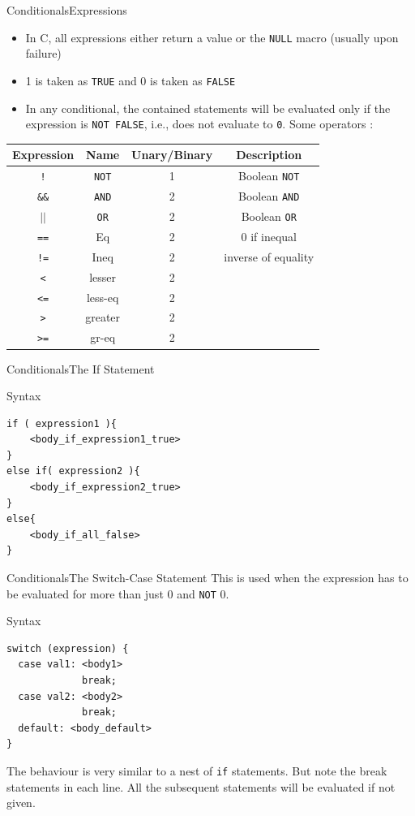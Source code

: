 \documentclass{beamer}
\begin{document}
\begin{frame}[fragile]{Conditionals}{Expressions}
\begin{itemize}
\item In C, all expressions either return a value or the \verb|NULL| macro (usually upon failure)
\item 1 is taken as \verb|TRUE| and 0 is taken as \verb|FALSE|
\item In any conditional, the contained statements will be evaluated only if the expression is \verb|NOT FALSE|, i.e., does not evaluate to \verb|0|. Some operators :
\end{itemize}
\begin{center}
\begin{tabular}{|c|c|c|c|}
\hline
Expression&Name&Unary/Binary&Description\\
\hline
\verb|!|&\verb|NOT|&1&Boolean \verb|NOT|\\
\verb|&&|&\verb|AND|&2&Boolean \verb|AND|\\
$||$&\verb|OR|&2&Boolean \verb|OR|\\
\verb|==|&Eq&2&0 if inequal\\
\verb|!=|&Ineq&2&inverse of equality\\
\verb|<|&lesser&2&\\
\verb|<=|&less-eq&2&\\
\verb|>|&greater&2&\\
\verb|>=|&gr-eq&2&\\
\hline
\end{tabular}
\end{center}
\end{frame}

\begin{frame}[fragile]{Conditionals}{The If Statement}
\begin{block}{Syntax}
\begin{verbatim}
if ( expression1 ){
    <body_if_expression1_true>
}
else if( expression2 ){
    <body_if_expression2_true>
}
else{
    <body_if_all_false>
}
\end{verbatim}
\end{block}
\end{frame}

\begin{frame}[fragile]{Conditionals}{The Switch-Case Statement}
This is used when the expression has to be evaluated for more than just 0 and \verb|NOT| 0.
\begin{block}{Syntax}
\begin{verbatim}
switch (expression) {
  case val1: <body1>
             break;
  case val2: <body2>
             break;
  default: <body_default>
}
\end{verbatim}
\end{block}
The behaviour is very similar to a nest of \verb|if| statements. But \alert{note the break statements in each line}.  All the subsequent statements will be evaluated if not given.
\end{frame}
\end{document}
